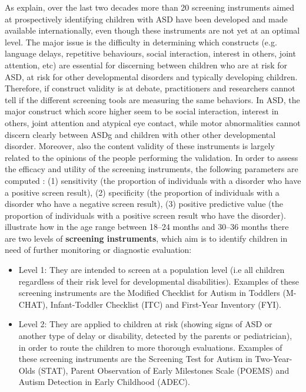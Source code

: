 As \cite{maganto2017screening} explain, over the last two decades more than 20 screening instruments aimed at prospectively identifying children with ASD have been developed and made available internationally, even though these instruments are not yet at an optimal level. The major issue is the difficulty in determining which constructs (e.g. language delays, repetitive behaviours, social interaction, interest in others, joint attention, etc) are essential for discerning between children who are at risk for ASD, at risk for other developmental disorders and typically developing children. Therefore, if construct validity is at debate, practitioners and researchers cannot tell if the different screening tools are measuring the same behaviors. In ASD, the major construct which score higher seem to be social interaction, interest in others, joint attention and atypical eye contact, while motor abnormalities cannot discern clearly between ASDg and children with other other developmental disorder. Moreover, also the content validity of these instruments is largely related to the opinions of the people performing the validation. In order to assess the efficacy and utility of the screening instruments, the following parameters are computed \citep{charman2013measuerement}: (1) sensitivity (the proportion of individuals with a disorder who have a positive screen result), (2) specificity (the proportion of individuals with a disorder who have a negative screen result), (3) positive predictive value (the proportion of individuals with a positive screen result who have the disorder).\\
\cite{towie2016screening} illustrate how in the age range between 18–24 months and 30–36 months there are two levels of \textbf{screening instruments}, which aim is to identify children in need of further monitoring or diagnostic evaluation:
\begin{itemize}
    \item Level 1: They are intended to screen at a population level (i.e all children regardless of their risk level for developmental disabilities). Examples of these screening instruments are the Modified Checklist for Autism in Toddlers (M-CHAT), Infant-Toddler Checklist (ITC) and First-Year Inventory (FYI).
    \item Level 2: They are applied to children at risk (showing signs of ASD or another type of delay or disability, detected by the parents or pediatrician), in order to route the children to more thorough evaluations. Examples of these screening instruments are the Screening Test for Autism in Two-Year-Olds (STAT), Parent Observation of Early Milestones Scale (POEMS) and Autism Detection in Early Childhood (ADEC).
\end{itemize}
